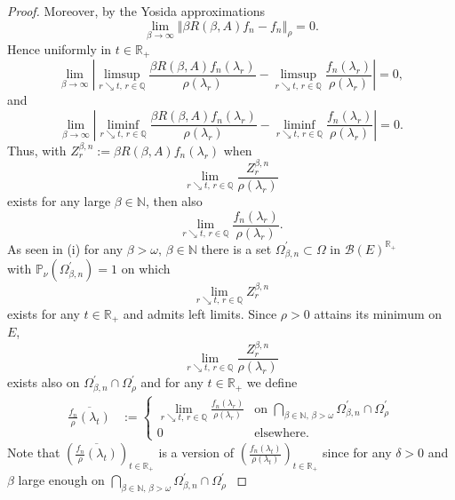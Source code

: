 \documentclass[a4paper,12pt]{article}
\theoremstyle{definition}
\theoremstyle{remark}
\numberwithin{equation}{section}
\numberwithin{theorem}{section}
\begin{document}
\begin{proof}
Moreover, by the Yosida approximations
\begin{equation}
\underset{\beta\rightarrow\infty}{\lim}\left\Vert \beta R(\beta,A)f_{n}-f_{n}\right\Vert _{\rho}=0.\label{eq:proof cadlag paths, Yosida approximation}
\end{equation}
Hence uniformly in $t\in\mathbb{R}_{+}$ 
\[
\underset{\beta\rightarrow\infty}{\lim}\left|\underset{r\searrow t,\,r\in\mathbb{Q}}{\limsup}\frac{\beta R(\beta,A)f_{n}(\lambda_{r})}{\rho(\lambda_{r})}-\underset{r\searrow t,\,r\in\mathbb{Q}}{\limsup}\frac{f_{n}(\lambda_{r})}{\rho(\lambda_{r})}\right|=0,
\]
and
\[
\underset{\beta\rightarrow\infty}{\lim}\left|\underset{r\searrow t,\,r\in\mathbb{Q}}{\liminf}\frac{\beta R(\beta,A)f_{n}(\lambda_{r})}{\rho(\lambda_{r})}-\underset{r\searrow t,\,r\in\mathbb{Q}}{\liminf}\frac{f_{n}(\lambda_{r})}{\rho(\lambda_{r})}\right|=0.
\]
 Thus, with $Z_{r}^{\beta,n}:=\beta R(\beta,A)f_{n}(\lambda_{r})$ when 
\[
\underset{r\searrow t,\,r\in\mathbb{Q}}{\lim}\frac{Z_{r}^{\beta,n}}{\rho(\lambda_{r})}
\]
exists for any large $\beta\in\mathbb{N}$, then also
\[
\underset{r\searrow t,\,r\in\mathbb{Q}}{\lim}\frac{f_{n}(\lambda_{r})}{\rho(\lambda_{r})}.
\]
 As seen in (i) for any $\beta>\omega,\,\beta\in\mathbb{N}$ there
is a set $\Omega_{\beta,n}^{'}\subset\Omega$ in $\mathcal{B}(E)^{\mathbb{R}_{+}}$\\
 with
$\mathbb{P}_{\nu}\left(\Omega_{\beta,n}^{'}\right)=1$ on which 
\[
\underset{r\searrow t,\,r\in\mathbb{Q}}{\lim}Z_{r}^{\beta,n}
\]
exists for any $t\in\mathbb{R}_{+}$ and admits left limits. Since $\rho>0$ attains its
minimum on $E$, 
\[
\underset{r\searrow t,\,r\in\mathbb{Q}}{\lim}\frac{Z_{r}^{\beta,n}}{\rho(\lambda_{r})}
\]
 exists also
on $\Omega_{\beta,n}^{'}\cap\Omega_{\rho}^{'}$  
and for any $t\in\mathbb{R}_{+}$ we define
\begin{align*}
\overline{\frac{f_{n}}{\rho}(\lambda_{t})} & :=\begin{cases}
\underset{r\searrow t,\,r\in\mathbb{Q}}{\lim}\frac{f_{n}(\lambda_{r})}{\rho(\lambda_{r})} & \text{on }\underset{\beta\in\mathbb{N},\,\beta>\omega}{\bigcap}\Omega_{\beta,n}^{'}\cap\Omega_{\rho}^{'}\\
0 & \text{elsewhere}.
\end{cases}
\end{align*}
Note that
$\left(\overline{\frac{f_{n}}{\rho}(\lambda_{t})}\right)_{t\in\mathbb{\mathbb{R}}_{+}}$
is a version of $\left(\frac{f_{n}(\lambda_{t})}{\rho(\lambda_{t})}\right)_{t\in\mathbb{\mathbb{R}}_{+}}$
since for any $\delta>0$ and $\beta$ large enough on $\underset{\beta\in\mathbb{N},\,\beta>\omega}{\bigcap}\Omega_{\beta,n}^{'}\cap\Omega_{\rho}^{'}${\small{}
}
\end{proof}
\end{document}
